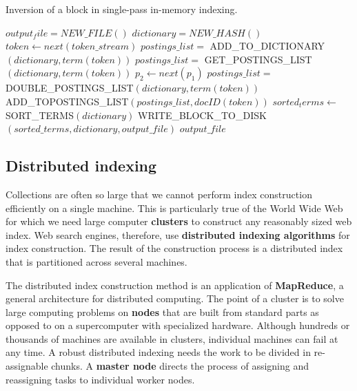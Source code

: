 \documentclass[letterpaper,11pt]{article}
\begin{document}
\begin{algorithm}[H] 
\begin{algorithmic}[1]
\label{SPIMI_INVERT} %
\caption{Inversion of a block in single-pass in-memory indexing.}
    \State $output_file = NEW\_FILE()$
    \State $dictionary = NEW\_HASH()$
        \State $token \gets next(token\_stream)$
            \State $postings\_list =$ ADD\_TO\_DICTIONARY$(dictionary, term(token))$
        \Else
            \State $postings\_list =$ GET\_POSTINGS\_LIST$(dictionary, term(token))$
            \State $p_2 \gets next(p_1)$
        \EndIf
            \State $postings\_list =$ DOUBLE\_POSTINGS\_LIST$(dictionary, term(token))$
        \EndIf
        \State ADD\_TOPOSTINGS\_LIST$(postings\_list, docID(token))$
    \EndWhile
    \State $sorted_terms \gets$ SORT\_TERMS$(dictionary)$
    \State WRITE\_BLOCK\_TO\_DISK$(sorted\_terms, dictionary, output\_file)$
    \State \Return $output\_ file$
\EndFunction
\end{algorithmic}
\end{algorithm}

\subsection{Distributed indexing}
Collections are often so large that we cannot perform index construction efficiently on a single machine. This is particularly true of the World Wide Web for which we need large computer \textbf{clusters} to construct any reasonably sized web index. Web search engines, therefore, use \textbf{distributed indexing algorithms} for index construction. The result of the construction process is a distributed index that is partitioned across several machines.

The distributed index construction method is an application of \textbf{MapReduce}, a general architecture for distributed computing. The point of a cluster is to solve large computing problems on \textbf{nodes} that are built from standard parts as opposed to on a supercomputer with specialized hardware. Although hundreds or thousands of machines are available in clusters, individual machines can fail at any time. A robust distributed indexing needs the work to be divided in re-assignable chunks. A \textbf{master node} directs the process of assigning and reassigning tasks to individual worker nodes.
\end{document}
